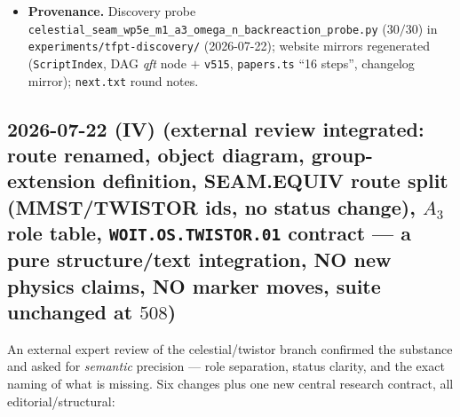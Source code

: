 \begin{itemize}[leftmargin=1.5em]
forcing $N\in4\Z$; source curve $K_4$; conifold nodes; KILL probe $+$ EH/$\operatorname{diag}(i,i)$
controls) added to \texttt{tfpt\_readouts\_extension.wl} and verified with the active engine,
$490\to498$; \texttt{GATE.WOLFRAM.02}, Wolfram README and the website counters synced
($116/116+498/498$).
\item \textbf{Provenance.} Discovery probe
\texttt{celestial\_seam\_}\allowbreak\texttt{wp5e\_m1\_}\allowbreak\texttt{a3\_omega\_n\_}\allowbreak\texttt{backreaction\_probe.py}
($30/30$) in \texttt{experiments/tfpt-discovery/} (2026-07-22); website mirrors regenerated
(\texttt{ScriptIndex}, DAG \emph{qft} node $+$ \texttt{v515}, \texttt{papers.ts} ``16 steps'',
changelog mirror); \texttt{next.txt} round notes.
\end{itemize}

\subsection*{2026-07-22 (IV) (external review integrated: route renamed, object diagram, group-extension definition, SEAM.EQUIV route split (MMST/TWISTOR ids, no status change), $A_3$ role table, \texttt{WOIT.OS.TWISTOR.01} contract --- a pure structure/text integration, NO new physics claims, NO marker moves, suite unchanged at $508$)}
An external expert review of the celestial/twistor branch confirmed the substance and asked for
\emph{semantic} precision --- role separation, status clarity, and the exact naming of what is
missing. Six changes plus one new central research contract, all editorial/structural:
